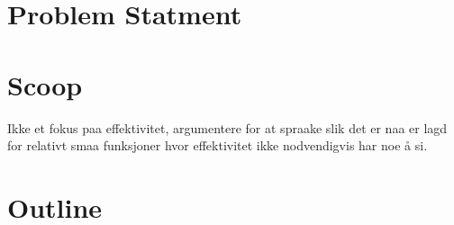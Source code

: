 \section{Problem Statment}

\section{Scoop}
Ikke et fokus paa effektivitet, argumentere for at spraake slik det er naa er lagd for relativt smaa funksjoner hvor effektivitet ikke nodvendigvis har noe å si. 
\section{Outline}